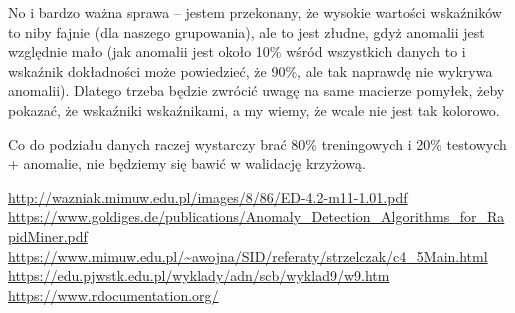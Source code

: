 \documentclass[11pt,a4paper,twoside]{article}
\begin{document}
No i bardzo ważna sprawa -- jestem przekonany, że wysokie wartości wskaźników to niby fajnie (dla naszego grupowania), ale to jest złudne, gdyż anomalii jest względnie mało (jak anomalii jest około 10\% wśród wszystkich danych to i wskaźnik dokładności może powiedzieć, że 90\%, ale tak naprawdę nie wykrywa anomalii). Dlatego trzeba będzie zwrócić uwagę na same macierze pomyłek, żeby pokazać, że wskaźniki wskaźnikami, a my wiemy, że wcale nie jest tak kolorowo.

Co do podziału danych raczej wystarczy brać 80\% treningowych i 20\% testowych + anomalie, nie będziemy się bawić w walidację krzyżową.

\begin{thebibliography}{9}
\url{http://wazniak.mimuw.edu.pl/images/8/86/ED-4.2-m11-1.01.pdf}
\url{https://www.goldiges.de/publications/Anomaly_Detection_Algorithms_for_RapidMiner.pdf}
\url{https://www.mimuw.edu.pl/~awojna/SID/referaty/strzelczak/c4_5Main.html}
\url{https://edu.pjwstk.edu.pl/wyklady/adn/scb/wyklad9/w9.htm}
\url{https://www.rdocumentation.org/}


\end{thebibliography}
\end{document}
